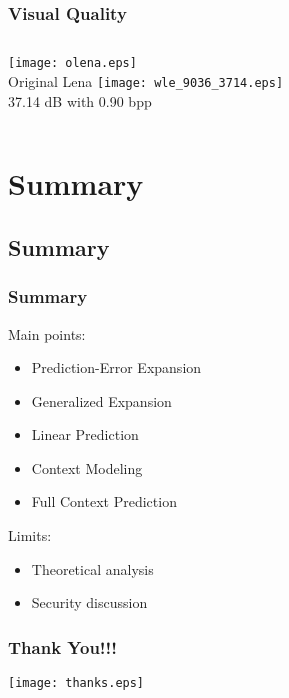 \documentclass[slidestop,compress]{beamer}
\begin{document}
\begin{frame}
\frametitle{Visual Quality }
    \begin{columns}[c]
	\texttt{[image: olena.eps]} \\
	Original Lena
	\texttt{[image: wle\_9036\_3714.eps]} \\
	37.14 dB with 0.90 bpp
    \end{columns}
\end{frame}

\section{Summary}
\subsection*{Summary}
\begin{frame}
    \frametitle{Summary}
    Main points: \\
    \begin{itemize}
	\item Prediction-Error Expansion
	\item Generalized Expansion
	\item Linear Prediction
	\item Context Modeling
	\item Full Context Prediction
    \end{itemize}
    Limits: \\
    \begin{itemize}
	\item Theoretical analysis
	\item Security discussion
    \end{itemize}
\end{frame}

\begin{frame}
\frametitle{Thank You!!!}
    \centering
    \hspace{2cm}
    \texttt{[image: thanks.eps]}
\end{frame}
\end{document}
